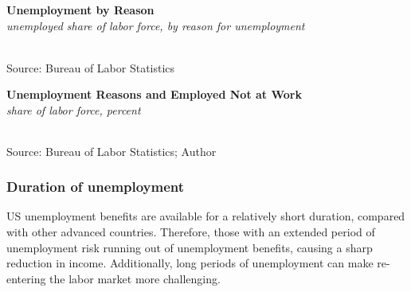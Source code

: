 \documentclass{report}
\makeatletter
\newcommand{\tbllink}[1]{\href{https://raw.githubusercontent.com/bdecon/US-chartbook/master/chartbook/data/#1}{\faTable}}
\newcommand*\short[1]{\expandafter\@gobbletwo\number\numexpr#1\relax}
\newcommand{\ctsbar}[5]{
		\addplot[ybar stacked, bar width=#5, draw opacity=0, fill=#1] 
			table [x=#2, y=#3, col sep=comma]{#4};}
\newcommand{\dateaxisticks}{
		date coordinates in=x, axis line style={draw=none},
		xmax={2021-05-15},
		max space between ticks=40,	    
		xtick={{1990-01-01}, {1992-01-01}, {1994-01-01}, 
			{1996-01-01}, {1998-01-01}, {2000-01-01}, 
			{2002-01-01}, {2004-01-01}, {2006-01-01},
			{2008-01-01}, {2010-01-01}, {2012-01-01}, {2014-01-01},
		    {2016-01-01}, {2018-01-01}, {2020-01-01}},
		minor xtick={{1989-01-01}, {1991-01-01}, {1993-01-01},
			{1995-01-01}, {1997-01-01}, {1999-01-01}, 
			{2001-01-01}, {2003-01-01}, {2005-01-01}, {2007-01-01},
		    {2009-01-01}, {2011-01-01}, {2013-01-01}, {2015-01-01},
		    {2017-01-01}, {2019-01-01}, {2021-01-01}},
		enlarge y limits={0.06}, enlarge x limits={0.01},
		}
\newcommand{\bbar}[2]{extra #1 ticks = {{#2}}, extra #1 tick labels = ,
		extra #1 tick style = {grid=major, grid style={thick, black!25}},}
\newcommand{\rbars}{
		\fill[color=black!10] (axis cs:{1990-07-01},\pgfkeysvalueof{/pgfplots/ymin}) rectangle 
			(axis cs:{1991-03-01}, \pgfkeysvalueof{/pgfplots/ymax});
		\fill[color=black!10] (axis cs:{2007-12-01},\pgfkeysvalueof{/pgfplots/ymin}) rectangle 
			(axis cs:{2009-07-01}, \pgfkeysvalueof{/pgfplots/ymax});
		\fill[color=black!10] (axis cs:{2001-03-01},\pgfkeysvalueof{/pgfplots/ymin}) rectangle 
			(axis cs:{2001-11-01}, \pgfkeysvalueof{/pgfplots/ymax});
		\fill[color=black!10] (axis cs:{2020-02-01},\pgfkeysvalueof{/pgfplots/ymin}) rectangle 
			(axis cs:{2021-05-15}, \pgfkeysvalueof{/pgfplots/ymax});}
\makeatother
\begin{document}
{{\begin{minipage}{0.99\textwidth} 
\normalsize \textbf{Unemployment by Reason}\\
\footnotesize{\textit{unemployed share of labor force, by reason for unemployment}}\\
\hspace*{-2mm} \\
\footnotesize{Source: Bureau of Labor Statistics} \hfill \tbllink{unemp_reason.csv}
\vspace{4mm}

\normalsize \textbf{Unemployment Reasons and Employed Not at Work}\\
\footnotesize{\textit{share of labor force, percent}}\\
 \setlength{\tabcolsep}{3.1pt} \color{black!90}
	{\renewcommand{\arraystretch}{1.55}
		\begin{tabular}{p{31mm} R{6.7mm} R{6.7mm} R{6.7mm} R{6.7mm} R{6.7mm} R{6.7mm} 
		   R{6.7mm} R{6.7mm} R{6.7mm} R{6.7mm} R{6.7mm}}
			  \hline
		\end{tabular}}\vspace{-2mm}
		
\footnotesize{Source: Bureau of Labor Statistics; Author}
\end{minipage}
\newpage
\begin{minipage}{0.76\textwidth} 
\subsubsection*{\color{black!70} \seriffont Duration of unemployment}
\small US unemployment benefits are available for a relatively short duration, compared with other advanced countries. Therefore, those with an extended period of unemployment risk running out of unemployment benefits, causing a sharp reduction in income. Additionally, long periods of unemployment can make re-entering the labor market more challenging. 


\end{minipage}}}
\end{document}
